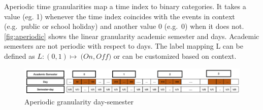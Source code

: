 \documentclass[10pt,a4paper,]{article}
\begin{document}
Aperiodic time granularities map a time index to binary categories. It takes a value (eg. 1) whenever the time index coincides with the events in context (e.g.~public or school holiday) and another value 0 (e.g.~0) when it does not. \autoref{fig:aperiodic} shows the linear granularity academic semester and days. Academic semesters are not periodic with respect to days. The label mapping L can be defined as \(L: ({0,1}) \longmapsto\ ({On, Off)}\) or can be customized based on context.

\begin{figure}
\includegraphics[width=1\linewidth]{Figs/academ-semester} \caption{ Aperiodic granularity day-semester}\label{fig:aperiodic}
\end{figure}

\printbibliography
\end{document}
